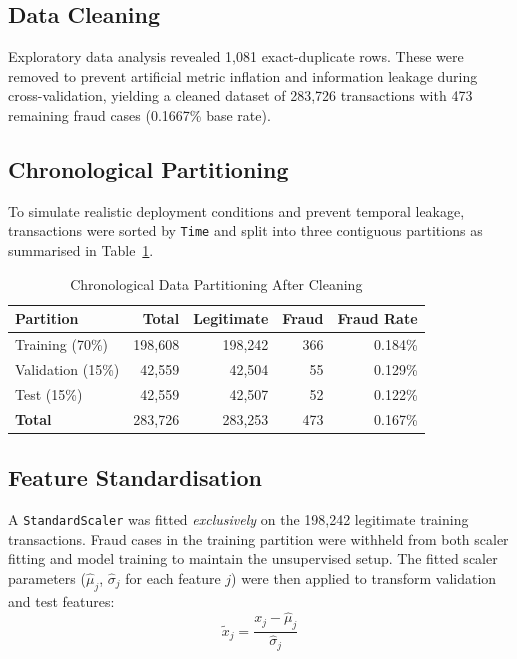 \documentclass[conference,10pt]{IEEEtran}
\begin{document}
\subsection{Data Cleaning}
Exploratory data analysis revealed 1,081 exact-duplicate rows.  These were
removed to prevent artificial metric inflation and information leakage during
cross-validation, yielding a cleaned dataset of 283,726 transactions with 473
remaining fraud cases (0.1667\% base rate).

\subsection{Chronological Partitioning}
To simulate realistic deployment conditions and prevent temporal leakage,
transactions were sorted by \texttt{Time} and split into three contiguous
partitions as summarised in Table~\ref{tab:split}.

\begin{table}[htbp]
\caption{Chronological Data Partitioning After Cleaning}
\label{tab:split}
\centering
\small
\begin{tabular}{@{}lrrrr@{}}
\toprule
Partition & Total & Legitimate & Fraud & Fraud Rate \\
\midrule
Training (70\%)   & 198,608 & 198,242 & 366 & 0.184\% \\
Validation (15\%) &  42,559 &  42,504 &  55 & 0.129\% \\
Test (15\%)       &  42,559 &  42,507 &  52 & 0.122\% \\
\midrule
\textbf{Total}    & 283,726 & 283,253 & 473 & 0.167\% \\
\bottomrule
\end{tabular}
\end{table}

\subsection{Feature Standardisation}
A \texttt{StandardScaler} was fitted \emph{exclusively} on the 198,242
legitimate training transactions.  Fraud cases in the training partition were
withheld from both scaler fitting and model training to maintain the
unsupervised setup.  The fitted scaler parameters ($\hat{\mu}_j$,
$\hat{\sigma}_j$ for each feature $j$) were then applied to transform
validation and test features:
\begin{equation}
\tilde{x}_j = \frac{x_j - \hat{\mu}_j}{\hat{\sigma}_j}
\end{equation}
\end{document}
